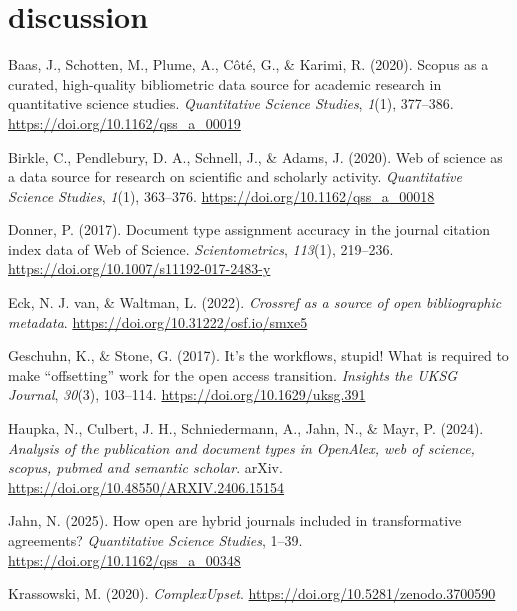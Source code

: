 \documentclass[a4paper,man,floatsintext,longtable,noextraspace,10pt]{apa6}
\newlength{\cslhangindent}
\newenvironment{CSLReferences}[2] %
{\begin{list}{}{%
  \setlength{\itemindent}{0pt}
  \setlength{\leftmargin}{0pt}
  \setlength{\parsep}{0pt}
  \ifodd #1
  \setlength{\leftmargin}{\cslhangindent}
  \setlength{\itemindent}{-1\cslhangindent}
  \fi
  \setlength{\itemsep}{#2\baselineskip}}}
{\end{list}}
\begin{document}
\section*{discussion}\label{discussion}

\label{refs}
\begin{CSLReferences}{1}{0}
Baas, J., Schotten, M., Plume, A., Côté, G., \& Karimi, R. (2020).
Scopus as a curated, high-quality bibliometric data source for academic
research in quantitative science studies. \emph{Quantitative Science
Studies}, \emph{1}(1), 377--386.
\url{https://doi.org/10.1162/qss_a_00019}

Birkle, C., Pendlebury, D. A., Schnell, J., \& Adams, J. (2020). Web of
science as a data source for research on scientific and scholarly
activity. \emph{Quantitative Science Studies}, \emph{1}(1), 363--376.
\url{https://doi.org/10.1162/qss_a_00018}

Donner, P. (2017). Document type assignment accuracy in the journal
citation index data of {Web of Science}. \emph{Scientometrics},
\emph{113}(1), 219--236. \url{https://doi.org/10.1007/s11192-017-2483-y}

Eck, N. J. van, \& Waltman, L. (2022). \emph{Crossref as a source of
open bibliographic metadata}.
\url{https://doi.org/10.31222/osf.io/smxe5}

Geschuhn, K., \& Stone, G. (2017). It's the workflows, stupid! What is
required to make {``offsetting''} work for the open access transition.
\emph{Insights the {UKSG} Journal}, \emph{30}(3), 103--114.
\url{https://doi.org/10.1629/uksg.391}

Haupka, N., Culbert, J. H., Schniedermann, A., Jahn, N., \& Mayr, P.
(2024). \emph{Analysis of the publication and document types in
OpenAlex, web of science, scopus, pubmed and semantic scholar}. arXiv.
\url{https://doi.org/10.48550/ARXIV.2406.15154}

Jahn, N. (2025). How open are hybrid journals included in transformative
agreements? \emph{Quantitative Science Studies}, 1--39.
\url{https://doi.org/10.1162/qss_a_00348}

Krassowski, M. (2020). \emph{ComplexUpset}.
\url{https://doi.org/10.5281/zenodo.3700590}


\end{CSLReferences}
\end{document}

